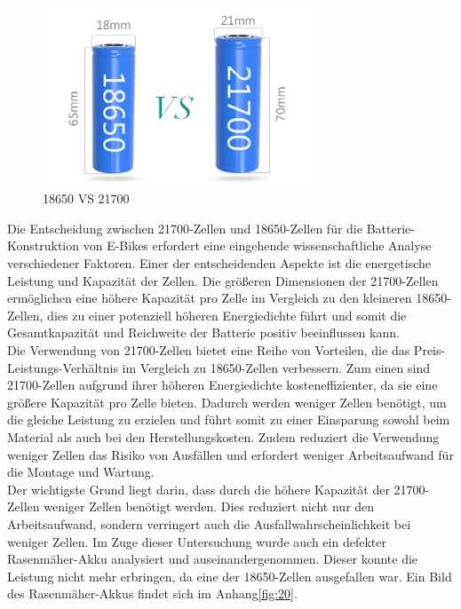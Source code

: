\begin{figure}[h]
    \centering
    \includegraphics[width=8cm]{images/18650-VS-21700.jpg}
    \caption{18650 VS 21700\cite{tritek_21700_2021}}
    \label{fig:1850VS21700}
\end{figure}



Die Entscheidung zwischen 21700-Zellen und 18650-Zellen für die Batterie-Konstruktion von E-Bikes erfordert eine eingehende wissenschaftliche Analyse verschiedener Faktoren.
Einer der entscheidenden Aspekte ist die energetische Leistung und Kapazität der Zellen.
Die größeren Dimensionen der 21700-Zellen ermöglichen eine höhere Kapazität pro Zelle im Vergleich zu den kleineren 18650-Zellen, dies zu einer potenziell höheren Energiedichte führt und somit die Gesamtkapazität und Reichweite der Batterie positiv beeinflussen kann.\\

Die Verwendung von 21700-Zellen bietet eine Reihe von Vorteilen, die das Preis-Leistungs-Verhältnis im Vergleich zu 18650-Zellen verbessern.
Zum einen sind 21700-Zellen aufgrund ihrer höheren Energiedichte kosteneffizienter, da sie eine größere Kapazität pro Zelle bieten.
Dadurch werden weniger Zellen benötigt, um die gleiche Leistung zu erzielen und führt somit zu einer Einsparung sowohl beim Material als auch bei den Herstellungskosten.
Zudem reduziert die Verwendung weniger Zellen das Risiko von Ausfällen und erfordert weniger Arbeitsaufwand für die Montage und Wartung.\\



Der wichtigste Grund liegt darin, dass durch die höhere Kapazität der 21700-Zellen weniger Zellen benötigt werden.
Dies reduziert nicht nur den Arbeitsaufwand, sondern verringert auch die Ausfallwahrscheinlichkeit bei weniger Zellen.
Im Zuge dieser Untersuchung wurde auch ein defekter Rasenmäher-Akku analysiert und auseinandergenommen.
Dieser konnte die Leistung nicht mehr erbringen, da eine der 18650-Zellen ausgefallen war.
Ein Bild des Rasenmäher-Akkus findet sich im Anhang\ref{fig:20}.\\

